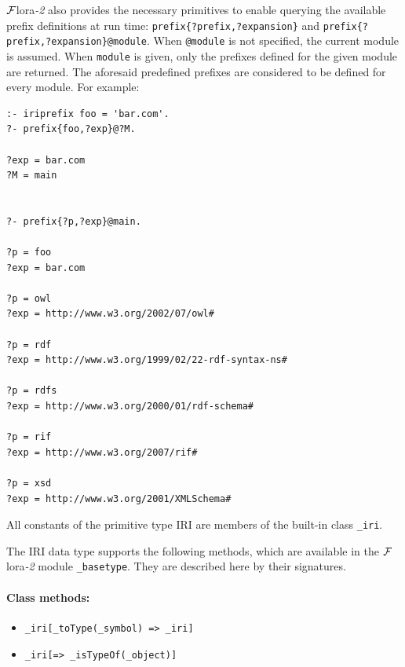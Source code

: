 \documentclass[11pt]{article}
\newcommand{\FLORA}{{\mbox{\sc ${\cal F}${lora}\rm\emph{-2}}}\xspace}
\begin{document}
\FLORA also provides the necessary primitives to enable querying the
available prefix definitions at run time:
\texttt{prefix\{?prefix,?expansion\}} and
\texttt{prefix\{?prefix,?expansion\}@module}.
When {\tt @module}  is not
specified, the current module is assumed. When {\tt module} is given,
only the prefixes defined for the given module are returned. The
aforesaid predefined prefixes are considered to be defined for every
module. For example:
\begin{verbatim}
:- iriprefix foo = 'bar.com'.
?- prefix{foo,?exp}@?M.

?exp = bar.com
?M = main


?- prefix{?p,?exp}@main.

?p = foo
?exp = bar.com

?p = owl
?exp = http://www.w3.org/2002/07/owl#

?p = rdf
?exp = http://www.w3.org/1999/02/22-rdf-syntax-ns#

?p = rdfs
?exp = http://www.w3.org/2000/01/rdf-schema#

?p = rif
?exp = http://www.w3.org/2007/rif#

?p = xsd
?exp = http://www.w3.org/2001/XMLSchema#
\end{verbatim}

All constants of the primitive type IRI are members of the built-in class
{\tt \_iri}. 

The IRI data type supports the following methods, which are available in
the \FLORA module {\tt \_basetype}. They are described here by their
signatures.
\paragraph{Class methods:}
\begin{itemize}
\item  {\tt \_iri[\_toType(\_symbol) => \_iri]}
\item {\tt \_iri[=> \_isTypeOf(\_object)]}
\end{itemize}
\end{document}
